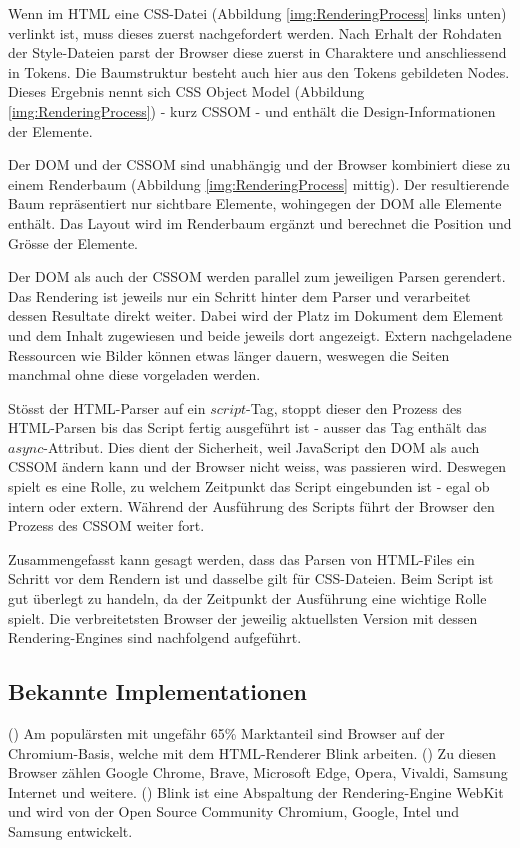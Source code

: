 Wenn im HTML eine CSS-Datei (Abbildung \ref{img:RenderingProcess} links unten) verlinkt ist, muss dieses zuerst nachgefordert werden.
Nach Erhalt der Rohdaten der Style-Dateien parst der Browser diese zuerst in Charaktere und anschliessend in Tokens.
Die Baumstruktur besteht auch hier aus den Tokens gebildeten Nodes. 
Dieses Ergebnis nennt sich CSS Object Model (Abbildung \ref{img:RenderingProcess}) - kurz CSSOM - und enthält die Design-Informationen der Elemente.

Der DOM und der CSSOM sind unabhängig und der Browser kombiniert diese zu einem Renderbaum (Abbildung \ref{img:RenderingProcess} mittig).
Der resultierende Baum repräsentiert nur sichtbare Elemente, wohingegen der DOM alle Elemente enthält.
Das Layout wird im Renderbaum ergänzt und berechnet die Position und Grösse der Elemente.

Der DOM als auch der CSSOM werden parallel zum jeweiligen Parsen gerendert.
Das Rendering ist jeweils nur ein Schritt hinter dem Parser und verarbeitet dessen Resultate direkt weiter.
Dabei wird der Platz im Dokument dem Element und dem Inhalt zugewiesen und beide jeweils dort angezeigt. %
Extern nachgeladene Ressourcen wie Bilder können etwas länger dauern, weswegen die Seiten manchmal ohne diese vorgeladen werden.

Stösst der HTML-Parser auf ein $script$-Tag, stoppt dieser den Prozess des HTML-Parsen bis das Script fertig ausgeführt ist - ausser das Tag enthält das $async$-Attribut.
Dies dient der Sicherheit, weil JavaScript den DOM als auch CSSOM ändern kann und der Browser nicht weiss, was passieren wird.
Deswegen spielt es eine Rolle, zu welchem Zeitpunkt das Script eingebunden ist - egal ob intern oder extern. 
Während der Ausführung des Scripts führt der Browser den Prozess des CSSOM weiter fort.

Zusammengefasst kann gesagt werden, dass das Parsen von HTML-Files ein Schritt vor dem Rendern ist und dasselbe gilt für CSS-Dateien. 
Beim Script ist gut überlegt zu handeln, da der Zeitpunkt der Ausführung eine wichtige Rolle spielt.
Die verbreitetsten Browser der jeweilig aktuellsten Version mit dessen Rendering-Engines sind nachfolgend aufgeführt.


\subsection{Bekannte Implementationen}
\label{sec:implementationsRenderer}

(\cite{blinkRenderer}) Am populärsten mit ungefähr 65\% Marktanteil sind Browser auf der Chromium-Basis, welche mit dem HTML-Renderer Blink arbeiten. 
(\cite{chromiumBrowser}) Zu diesen Browser zählen Google Chrome, Brave, Microsoft Edge, Opera, Vivaldi, Samsung Internet und weitere.
(\cite{blinkRenderer}) Blink ist eine Abspaltung der Rendering-Engine WebKit und wird von der Open Source Community Chromium, Google, Intel und Samsung entwickelt.

